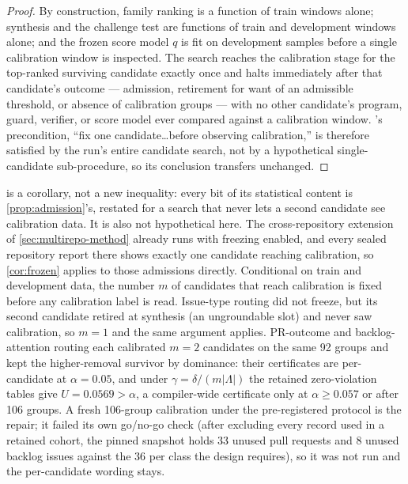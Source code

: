 \begin{proof}
By construction, family ranking is a function of train windows alone; synthesis and the
challenge test are functions of train and development windows alone; and the frozen score
model $q$ is fit on development samples before a single calibration window is inspected.
The search reaches the calibration stage for the top-ranked surviving candidate exactly
once and halts immediately after that candidate's outcome --- admission, retirement for
want of an admissible threshold, or absence of calibration groups --- with no other
candidate's program, guard, verifier, or score model ever compared against a calibration
window.  's precondition, ``fix one candidate\ldots before observing
calibration,'' is therefore satisfied by the run's entire candidate search, not by a
hypothetical single-candidate sub-procedure, so its conclusion transfers unchanged.
\end{proof}

 is a corollary, not a new inequality: every bit of its statistical
content is \cref{prop:admission}'s, restated for a search that never lets a second
candidate see calibration data.  It is also not hypothetical here.  The cross-repository
extension of \cref{sec:multirepo-method} already runs with freezing enabled, and every
sealed repository report there shows exactly one candidate reaching calibration, so
\cref{cor:frozen} applies to those admissions directly.  Conditional on train and
development data, the number $m$ of candidates that reach calibration is fixed before any
calibration label is read.  Issue-type routing did not freeze, but its second candidate
retired at synthesis (an ungroundable slot) and never saw calibration, so $m=1$ and the
same argument applies.  PR-outcome and backlog-attention routing each calibrated $m=2$
candidates on the same 92 groups and kept the higher-removal survivor by dominance: their
certificates are per-candidate at $\alpha=0.05$, and under $\gamma=\delta/(m|\Lambda|)$
the retained zero-violation tables give $U=0.0569>\alpha$, a compiler-wide certificate
only at $\alpha\ge0.057$ or after 106 groups.  A fresh 106-group calibration under the
pre-registered protocol  is the repair; it failed its
own go/no-go check (after excluding every record used in a retained cohort, the pinned
snapshot holds 33 unused  pull requests and 8 unused  backlog
issues against the 36 per class the design requires), so it was not run and the
per-candidate wording stays.

